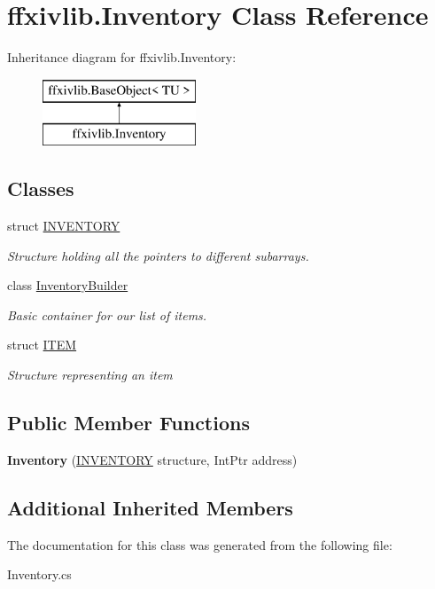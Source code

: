 \hypertarget{classffxivlib_1_1_inventory}{\section{ffxivlib.\-Inventory Class Reference}
\label{classffxivlib_1_1_inventory}
}
Inheritance diagram for ffxivlib.\-Inventory\-:\begin{figure}[H]
\begin{center}
\leavevmode
\includegraphics[height=2.000000cm]{classffxivlib_1_1_inventory}
\end{center}
\end{figure}
\subsection*{Classes}
\begin{DoxyCompactItemize}
\item 
struct \hyperlink{structffxivlib_1_1_inventory_1_1_i_n_v_e_n_t_o_r_y}{I\-N\-V\-E\-N\-T\-O\-R\-Y}
\begin{DoxyCompactList}\small\item\em Structure holding all the pointers to different subarrays. \end{DoxyCompactList}\item 
class \hyperlink{classffxivlib_1_1_inventory_1_1_inventory_builder}{Inventory\-Builder}
\begin{DoxyCompactList}\small\item\em Basic container for our list of items. \end{DoxyCompactList}\item 
struct \hyperlink{structffxivlib_1_1_inventory_1_1_i_t_e_m}{I\-T\-E\-M}
\begin{DoxyCompactList}\small\item\em Structure representing an item \end{DoxyCompactList}\end{DoxyCompactItemize}
\subsection*{Public Member Functions}
\begin{DoxyCompactItemize}
\item 
\hypertarget{classffxivlib_1_1_inventory_a15fea4c3d2b42bf899c5def99b69880a}{{\bfseries Inventory} (\hyperlink{structffxivlib_1_1_inventory_1_1_i_n_v_e_n_t_o_r_y}{I\-N\-V\-E\-N\-T\-O\-R\-Y} structure, Int\-Ptr address)}\label{classffxivlib_1_1_inventory_a15fea4c3d2b42bf899c5def99b69880a}

\end{DoxyCompactItemize}
\subsection*{Additional Inherited Members}


The documentation for this class was generated from the following file\-:\begin{DoxyCompactItemize}
\item 
Inventory.\-cs\end{DoxyCompactItemize}
